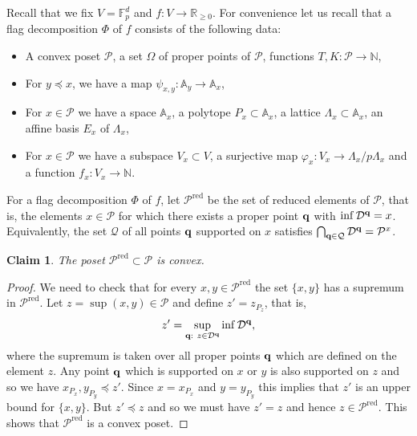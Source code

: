 \documentclass{daj}
\renewcommand{\ge}{\geqslant}
\newcommand{\R}{\mathbb R}
\newcommand{\A}{\mathbb A}
\newcommand{\N}{\mathbb N}
\newcommand{\FF}{\mathbb F}
\newcommand{\D}{\mathcal D}
\renewcommand{\P}{\mathcal P}
\newtheorem{claim}[theorem]{Claim}
\theoremstyle{definition}
\theoremstyle{remark}
\theoremstyle{definition}
\theoremstyle{definition}
\begin{document}
Recall that we fix $V = \FF_p^d$ and $f: V\to \R_{\ge 0}$. 
For convenience let us recall that a flag decomposition $\Phi$ of $f$ consists of the following data:
\begin{itemize}
    \item A convex poset $\P$, a set $\Omega$ of proper points of $\P$, functions $T, K: \P \rightarrow \N$, 
    \item For $y \preceq x$, we have a map $\psi_{x, y}: \A_y \rightarrow \A_x$,
    \item For $x \in \P$ we have a space $\A_x$, a polytope $P_x \subset \A_x$, a lattice $\Lambda_x \subset \A_x$, an affine basis $E_x$ of $\Lambda_x$, 
    \item For $x\in \P$ we have a subspace $V_x \subset V$, a surjective map $\varphi_x: V_x \rightarrow \Lambda_x /p\Lambda_x$ and a function $f_x: V_x \rightarrow \N$.
\end{itemize}

For a flag decomposition $\Phi$ of $f$, let $\P^{\text{red}}$ be the set of reduced elements of $\P$, that is, the elements $x\in \P$ for which there exists a proper point ${\bf q}$ with $\inf \D^{\bf q} =x$. Equivalently, the set $\mathcal Q$ of all points ${\bf q}$ supported on $x$ satisfies $\bigcap_{{\bf q}\in \mathcal Q} \D^{\bf q} = \P^x$.


\begin{claim}
The poset $\P^{\text{red}} \subset \P$ is convex.
\end{claim}

\begin{proof}
We need to check that for every $x, y \in \P^{\text{red}}$ the set $\{x, y\}$ has a supremum in $\P^{\text{red}}$. Let $z = \sup(x, y) \in \P$ and define $z' = z_{P_z}$, that is,
\begin{equation*}
    z' = \sup_{{\bf q}:~ z \in \D^{\bf q}} \inf \D^{\bf q},
\end{equation*}
where the supremum is taken over all proper points $\bf q$ which are defined on the element $z$. Any point $\bf q$ which is supported on $x$ or $y$ is also supported on $z$ and so we have $x_{P_x}, y_{P_y} \preceq z'$. Since $x = x_{P_x}$ and $y = y_{P_y}$ this implies that $z'$ is an upper bound for $\{x, y\}$. But $z'\preceq z$ and so we must have $z' = z$ and hence $z \in \P^{\text{red}}$. This shows that $\P^{\text{red}}$ is a convex poset.
\end{proof}
\end{document}

